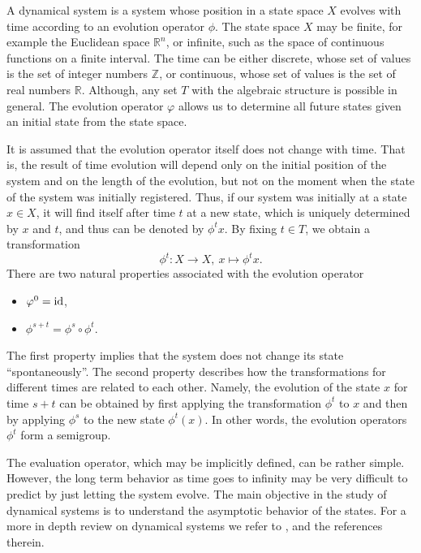 A dynamical system is a system whose position in a state space
$X$ evolves with time according to an evolution operator $\phi$. The state space $X$ may be finite,
for example the Euclidean space $\mathbb R^n$, or infinite, such as the space of
continuous functions on a finite interval. The time can be either discrete, whose
set of values is the set of integer numbers $\mathbb Z$, or continuous, whose set
of values is the set of real numbers $\mathbb R$. Although, any set $T$ with the
algebraic structure is possible in general. The evolution operator $\varphi$
allows us to determine all future states given an initial state from the state
space.

It is assumed that the evolution operator itself does not change with time.
That is, the result of time evolution will depend only on the initial position
of the system and on the length of the evolution, but not on the moment when
the state of the system was initially registered. Thus, if our system was
initially at a state $x \in X$, it will find itself after time $t$ at a new
state, which is uniquely determined by $x$ and $t$, and thus can be denoted by
$\phi^t x$. By fixing $t\in T$, we obtain a transformation 
\[
    \phi^t \colon X \rightarrow X,\  x \mapsto \phi^t x.
\]
There are two natural properties associated with the evolution operator
\begin{itemize}
    \item $\varphi^0 = \operatorname{id}$,
    \item $\phi^{s+t} = \phi^s \circ \phi^t$.
\end{itemize}
The first property implies that the system does not change its state
``spontaneously''. The second property describes how the transformations for
different times are related to each other. Namely, the evolution of the state
$x$ for time $s + t$ can be obtained by first applying the transformation
$\phi^t$  to $x$ and then by applying $\phi^s$ to the new state $\phi^t(x)$.
In other words, the evolution operators $\phi^t$ form a semigroup. 

The evaluation operator, which may be implicitly defined, can be rather simple.
However, the long term behavior as time goes to infinity may be very difficult to
predict by just letting the system evolve. The main objective in the study of
dynamical systems is to understand the asymptotic behavior of the states. For a
more in depth review on dynamical systems we refer to \cite{Kuznetsov2004}, and
the references therein.


